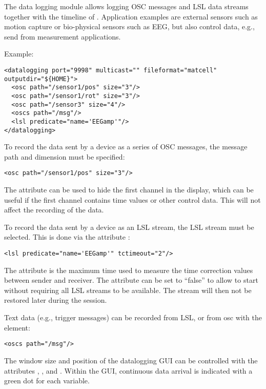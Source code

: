 The data logging module allows logging OSC messages and LSL data streams
together with the timeline of \tascar{}.
%
Application examples are external sensors such as motion capture or
bio-physical sensors such as EEG, but also control data, e.g., send from
measurement applications.

Example:
\begin{lstlisting}[numbers=none]
<datalogging port="9998" multicast="" fileformat="matcell" outputdir="${HOME}">
  <osc path="/sensor1/pos" size="3"/>
  <osc path="/sensor1/rot" size="3"/>
  <osc path="/sensor3" size="4"/>
  <oscs path="/msg"/>
  <lsl predicate="name='EEGamp'"/>
</datalogging>
\end{lstlisting}

To record the data sent by a device as a series of OSC messages, the
message path  and dimension  must be specified:
%
\begin{lstlisting}[numbers=none]
  <osc path="/sensor1/pos" size="3"/>
\end{lstlisting}
%
The  attribute can be used to hide the first channel
in the display, which can be useful if the first channel contains time
values or other control data. This will not affect the recording of the
data.

To record the data sent by a device as an LSL stream, the LSL stream
must be selected. This is done via the attribute :
\begin{lstlisting}[numbers=none]
  <lsl predicate="name='EEGamp'" tctimeout="2"/>
\end{lstlisting}
The  attribute is the maximum time used to measure the
time correction values between sender and receiver. The 
attribute can be set to ``false'' to allow \tascar{} to start without
requiring all LSL streams to be available. The stream will then not be
restored later during the session.

Text data (e.g., trigger messages) can be recorded from LSL, or from osc
with the  element:
\begin{lstlisting}[numbers=none]
  <oscs path="/msg"/>
\end{lstlisting}










The window size and position of the datalogging GUI can be controlled
with the attributes , ,  and .
%
Within the GUI, continuous data arrival is indicated with a green dot
for each variable.

